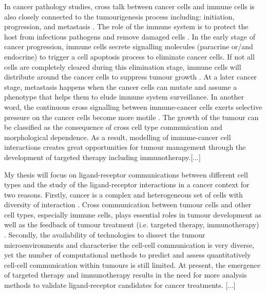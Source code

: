 In cancer pathology studies, cross talk between cancer cells and immune cells is also closely connected to the tumourigenesis process including: initiation, progression, and metastasis \cite{wang2017role}. The role of the immune system is to protect the host from infectious pathogens and remove damaged cells \cite{davis2007molecular}. In the early stage of cancer progression, immune cells secrete signalling molecules (paracrine or/and endocrine) to trigger a cell apoptosis process to eliminate cancer cells. If not all cells are completely cleared during this elimination stage, immune cells will distribute around the cancer cells to suppress tumour growth \cite{bronkhorst2011detection, ly2010aged}. At a later cancer stage, metastasis happens when the cancer cells can mutate and assume a phenotype that helps them to elude immune system surveillance. In another word, the continuous cross signalling between immune-cancer cells exerts selective pressure on the cancer cells become more motile \cite{giampieri2009localized,ilina2009mechanisms}. The growth of the tumour can be classified as the consequence of cross cell type communication and morphological dependence. As a result, modelling of immune-cancer cell interactions creates great opportunities for tumour management through the development of targeted therapy including immunotherapy.[...]

My thesis will focus on ligand-receptor communications between different cell types and the study of the ligand-receptor interactions in a cancer context for two reasons. Firstly, cancer is a complex and heterogeneous set of cells with diversity of interaction \cite{brucher2014cell}. Cross communication between tumour cells and other cell types, especially immune cells, plays essential roles in tumour development as well as the feedback of tumour treatment (i.e. targeted therapy, immunotherapy) \cite{hanahan2000hallmarks}. Secondly, the availability of technologies to dissect the tumour microenvironments and characterise the cell-cell communication is very diverse, yet the number of computational methods to predict and assess quantitatively cell-cell communication within tumours is still limited. At present, the emergence of targeted therapy and immunotherapy results in the need for more analysis methods to validate ligand-receptor candidates for cancer treatments. [...]

